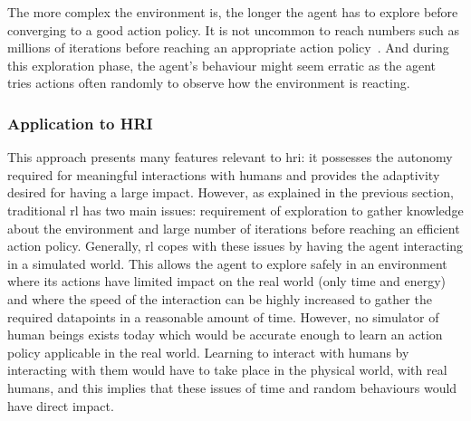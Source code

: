 	The more complex the environment is, the longer the agent has to explore before converging to a good action policy. It is not uncommon to reach numbers such as millions of iterations before reaching an appropriate action policy~\citep{sutton1998reinforcement}. And during this exploration phase, the agent's behaviour might seem erratic as the agent tries actions often randomly to observe how the environment is reacting.
	
	
	\subsubsection{Application to HRI}
	
	This approach presents many features relevant to \gls{hri}: it possesses the autonomy required for meaningful interactions with humans and provides the adaptivity desired for having a large impact. However, as explained in the previous section, traditional \gls{rl} has two main issues: requirement of exploration to gather knowledge about the environment and large number of iterations before reaching an efficient action policy. Generally, \gls{rl} copes with these issues by having the agent interacting in a simulated world. This allows the agent to explore safely in an environment where its actions have limited impact on the real world (only time and energy) and where the speed of the interaction can be highly increased to gather the required datapoints in a reasonable amount of time. However, no simulator of human beings exists today which would be accurate enough to learn an action policy applicable in the real world. Learning to interact with humans by interacting with them would have to take place in the physical world, with real humans, and this implies that these issues of time and random behaviours would have direct impact. 
	

